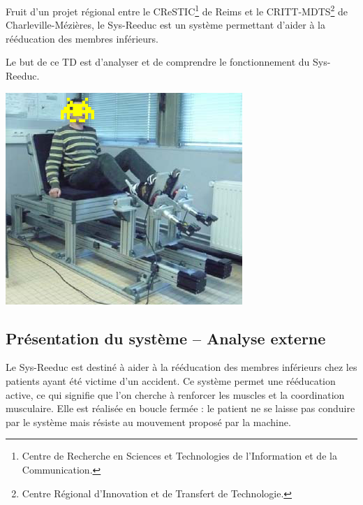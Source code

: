 \documentclass[10pt]{article}
\begin{document}
\begin{minipage}[c]{.7\linewidth}
Fruit d'un projet régional entre le CReSTIC\footnote{Centre de Recherche en Sciences et Technologies de l'Information et de la Communication.} de Reims et le CRITT-MDTS\footnote{Centre Régional d'Innovation et de Transfert de Technologie.} de Charleville-Mézières, le Sys-Reeduc est un système permettant d'aider à la rééducation des membres inférieurs. 
\begin{obj} 
Le but de ce TD est d'analyser et de comprendre le fonctionnement du Sys-Reeduc.
\end{obj}

\end{minipage} \hfill
\begin{minipage}[c]{.27\linewidth}
\begin{center}
\includegraphics[width=\textwidth]{images/Sys_Reeduc_01}
\end{center}
\end{minipage}

\subsection*{Présentation du système -- Analyse externe}

Le Sys-Reeduc est destiné à aider à la rééducation des membres inférieurs chez les patients ayant été victime d'un accident. Ce système permet une rééducation active, ce qui signifie que l'on cherche à renforcer les muscles et la coordination musculaire. Elle est réalisée en boucle fermée : le patient ne se laisse pas conduire par le système mais résiste au mouvement proposé par la machine.
\end{document}
